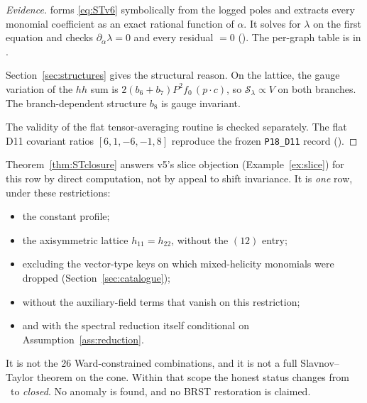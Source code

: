 \begin{proof}[Evidence]
 forms \eqref{eq:STv6} symbolically from the
logged poles and extracts every monomial coefficient as an exact
rational function of \(\alpha\).
It solves for \(\lambda\) on the first equation and checks
\(\partial_\alpha\lambda=0\) and every residual \(=0\)
().
The per-graph table is in .

Section~\ref{sec:structures} gives the structural reason.
On the lattice, the gauge variation of the \(hh\) sum is
\(2(b_6+b_7)P^2f_0\,(p\cdot c)\), so
\(\mathcal S_\lambda\propto V\) on both branches.
The branch-dependent structure \(b_8\) is gauge invariant.

The validity of the flat tensor-averaging routine is checked
separately. The flat D11 covariant ratios \([6,1,-6,-1,8]\)
reproduce the frozen \texttt{P18\_D11} record
().
\end{proof}

\begin{remark}
\label{rem:STscope}
Theorem~\ref{thm:STclosure} answers v5's slice objection
(Example~\ref{ex:slice}) for this row by direct computation, not
by appeal to shift invariance.
It is \emph{one} row, under these restrictions:
\begin{itemize}
\item the constant profile;
\item the axisymmetric lattice \(h_{11}=h_{22}\), without the
\((12)\) entry;
\item excluding the vector-type keys on which mixed-helicity
monomials were dropped (Section~\ref{sec:catalogue});
\item without the auxiliary-field terms that vanish on this
restriction;
\item and with the spectral reduction itself conditional on
Assumption~\ref{ass:reduction}.
\end{itemize}
It is not the 26 Ward-constrained combinations, and it is not a
full Slavnov--Taylor theorem on the cone.
Within that scope the honest status changes from \UNVALIDATED\
to \emph{closed}.
No anomaly is found, and no BRST restoration is claimed.
\end{remark}
